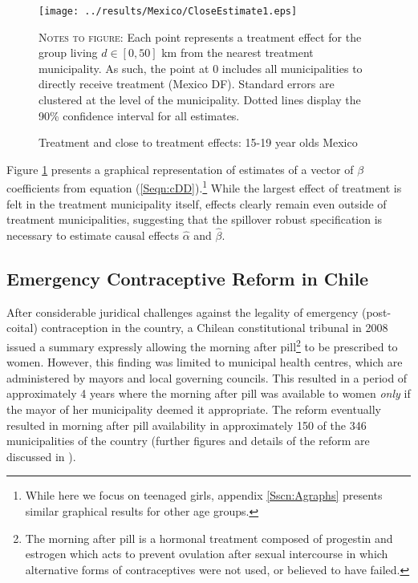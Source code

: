 \documentclass{article}
\begin{document}
\begin{spacing}{1.3}
\begin{figure}[h!]
\texttt{[image: ../results/Mexico/CloseEstimate1.eps]}
\caption{Treatment and close to treatment effects: 15-19 year olds Mexico}
\label{SFig:MexClose}
\vspace{2mm}
\begin{footnotesize}
\textsc{Notes to figure}: Each point represents a treatment effect for the group
living $d\in [0,50]$ km from the nearest treatment municipality.  As such, the
point at 0 includes all municipalities to directly receive treatment (Mexico DF).
Standard errors are clustered at the level of the municipality.  Dotted lines 
display the 90\% confidence interval for all estimates.
\end{footnotesize}
\end{figure}
Figure \ref{SFig:MexClose} presents a graphical representation of estimates
of a vector of $\beta$ coefficients from equation (\ref{Seqn:cDD}).\footnote{
While here we focus on teenaged girls, appendix \ref{Sscn:Agraphs} presents
similar graphical results for other age groups.}  While the largest effect of 
treatment is felt in the treatment municipality itself, effects clearly remain 
even outside of treatment municipalities, suggesting that the spillover robust 
specification is necessary to estimate causal effects $\hat\alpha$ and 
$\hat\beta$.

\subsection{Emergency Contraceptive Reform in Chile}
After considerable juridical challenges against the legality of emergency 
(post-coital) contraception in the country, a Chilean constitutional tribunal in 
2008 issued a summary expressly allowing the morning after pill\footnote{The morning
  after pill is a hormonal treatment composed of progestin and estrogen which acts
to prevent ovulation after sexual intercourse in which alternative forms of 
contraceptives were not used, or believed to have failed.} to be prescribed
to women.  However, this finding was limited to municipal health centres, which
are administered by mayors and local governing councils.  This resulted in a 
period of approximately 4 years where the morning after pill was available to
women \emph{only} if the mayor of her municipality deemed it appropriate.  The
reform eventually resulted in morning after pill availability in approximately
150 of the 346 municipalities of the country (further figures and details of the
reform are discussed in \citet{Clarke2014}).


\end{spacing}
\end{document}
